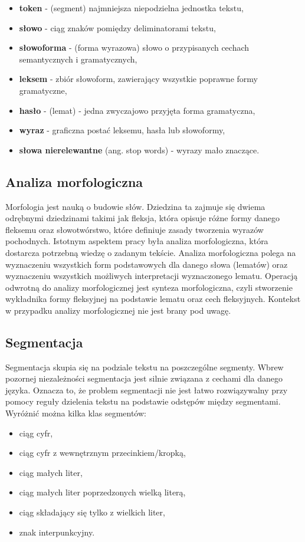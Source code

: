 \begin{itemize}
\item \textbf{token} - (segment) najmniejsza niepodzielna jednostka tekstu,
\item \textbf{słowo} - ciąg znaków pomiędzy deliminatorami tekstu,
\item \textbf{słowoforma} - (forma wyrazowa) słowo o przypisanych cechach semantycznych i gramatycznych,
\item \textbf{leksem} - zbiór słowoform, zawierający wszystkie poprawne formy gramatyczne,
\item \textbf{hasło} - (lemat) - jedna zwyczajowo przyjęta forma gramatyczna,
\item \textbf{wyraz} - graficzna postać leksemu, hasła lub słowoformy,
\item \textbf{słowa nierelewantne} (ang. stop words) - wyrazy mało znaczące.
\end{itemize}


\subsection{Analiza morfologiczna}
Morfologia jest nauką o budowie słów. Dziedzina  ta zajmuje się dwiema odrębnymi dziedzinami takimi jak fleksja, która opisuje różne formy danego fleksemu oraz słowotwórstwo, które definiuje zasady tworzenia wyrazów pochodnych. \cite{mykowiecka}
Istotnym aspektem pracy była analiza morfologiczna, która dostarcza potrzebną wiedzę o zadanym tekście. Analiza morfologiczna polega na wyznaczeniu wszystkich form podstawowych dla danego słowa (lematów) oraz wyznaczeniu wszystkich możliwych interpretacji wyznaczonego lematu. Operacją odwrotną do analizy morfologicznej jest synteza morfologiczna, czyli stworzenie wykładnika formy fleksyjnej na podstawie lematu oraz cech fleksyjnych. Kontekst w przypadku analizy morfologicznej nie jest brany pod uwagę. \cite{morfeusz-reference}

\subsection{Segmentacja}
Segmentacja skupia się na podziale tekstu na poszczególne segmenty. Wbrew pozornej niezależności segmentacja jest silnie związana z cechami dla danego języka. Oznacza to, że problem segmentacji nie jest łatwo rozwiązywalny przy pomocy reguły dzielenia tekstu na podstawie odstępów między segmentami. \cite{mykowiecka} Wyróżnić można kilka klas segmentów:
\begin{itemize}
\item ciąg cyfr,
\item ciąg cyfr z wewnętrznym przecinkiem/kropką,
\item ciąg małych liter,
\item ciąg małych liter poprzedzonych wielką literą,
\item ciąg składający się tylko z wielkich liter,
\item znak interpunkcyjny.
\end{itemize}

